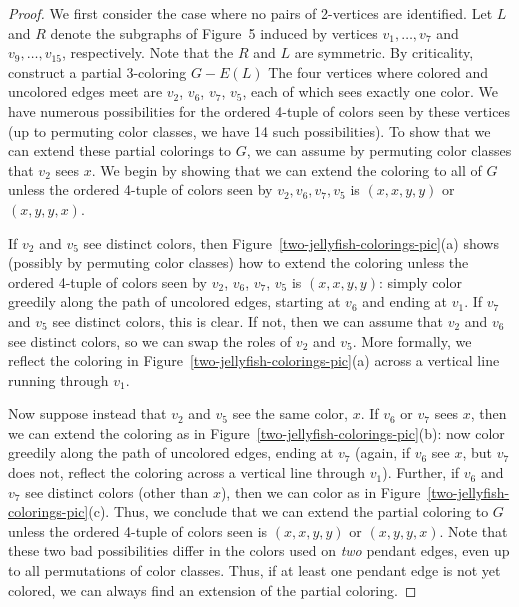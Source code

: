 \documentclass[12pt]{article}
\theoremstyle{plain}
\theoremstyle{definition}
\theoremstyle{remark}
\begin{document}
\begin{proof}
We first consider the case where no pairs of 2-vertices are identified.
Let $L$ and $R$ denote the subgraphs of Figure~5 induced by vertices
$v_1,\ldots,v_7$ and $v_9, \ldots,v_{15}$, respectively.
Note that the $R$ and $L$ are symmetric.
By criticality, construct
a partial 3-coloring $G-E(L)$ 
The four vertices where colored and uncolored edges meet are $v_2$, $v_6$,
$v_7$, $v_5$, each of which sees exactly one color.
We have numerous possibilities for the ordered 4-tuple of colors seen by these
vertices (up to permuting color classes, we have 14 such possibilities).
To show that we can extend these partial colorings to $G$, we can assume by
permuting color classes that $v_2$ sees $x$.  We begin by showing that we can
extend the coloring to all of $G$ unless the ordered 4-tuple of colors seen by
$v_2, v_6, v_7, v_5$ is $(x,x,y,y)$ or $(x,y,y,x)$. 

If $v_2$ and $v_5$ see distinct colors, then
Figure~\ref{two-jellyfish-colorings-pic}(a) shows 
(possibly by permuting color classes) how to extend the coloring
unless the ordered 4-tuple of colors seen by $v_2$, $v_6$, $v_7$, $v_5$ is
$(x,x,y,y)$: simply color greedily along the path of uncolored edges, starting
at $v_6$ and ending at $v_1$.  If $v_7$ and $v_5$ see distinct colors, this is
clear.  If not, then we can assume that $v_2$ and $v_6$ see distinct colors, so
we can swap the roles of $v_2$ and $v_5$.  More formally, we reflect the
coloring in Figure~\ref{two-jellyfish-colorings-pic}(a) across a vertical line
running through $v_1$.

Now suppose instead that $v_2$ and $v_5$ see the same color, $x$.  If $v_6$ or
$v_7$ sees $x$, then we can extend the coloring as in
Figure~\ref{two-jellyfish-colorings-pic}(b): now color greedily along the
path of uncolored edges, ending at $v_7$ (again, if $v_6$ see $x$, but $v_7$
does not, reflect the coloring across a vertical line through $v_1$).  
Further, if $v_6$ and $v_7$ see distinct colors (other than $x$), then we can
color as in Figure~\ref{two-jellyfish-colorings-pic}(c).  Thus, we conclude
that we can extend the partial coloring to $G$ unless the ordered 4-tuple of
colors seen is $(x,x,y,y)$ or $(x,y,y,x)$.  Note that these two bad
possibilities differ in the colors used on \emph{two} pendant edges, even up to
all permutations of color classes.  Thus, if at least one pendant edge is not
yet colored, we can always find an extension of the partial coloring.


\end{proof}
\end{document}
